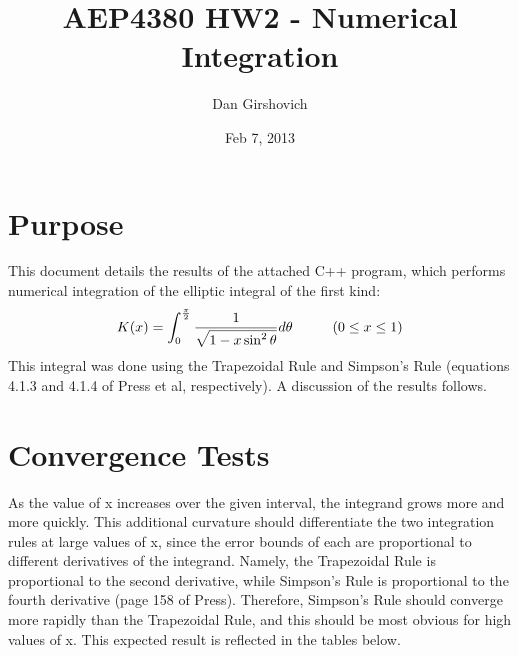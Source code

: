 \documentclass{article}
\title{AEP4380 HW2 - Numerical Integration}
\author{Dan Girshovich}
\date{Feb 7, 2013}
\begin{document}
\maketitle

\section{Purpose}
This document details the results of the attached C++ program, which performs numerical integration of the elliptic integral of the first kind:
\begin{align*}
K(x) = \int_{0}^{\frac{\pi}{2}} \frac{1}{\sqrt{1 - x \sin^2{\theta }}} d\theta \hspace{10mm} (0 \leq  x \leq 1)
\end{align*}
This integral was done using the Trapezoidal Rule and Simpson's Rule (equations 4.1.3 and 4.1.4 of Press\citep{numericalrecipies} et al, respectively). A discussion of the results follows.


\section{Convergence Tests}
As the value of x increases over the given interval, the integrand grows more and more quickly. This additional curvature should differentiate the two integration rules at large values of x, since the error bounds of each are proportional to different derivatives of the integrand. Namely, the Trapezoidal Rule is proportional to the second derivative, while Simpson's Rule is proportional to the fourth derivative (page 158 of Press\citep{numericalrecipies}). Therefore, Simpson's Rule should converge more rapidly than the Trapezoidal Rule, and this should be most obvious for high values of x. This expected result is reflected in the tables below.
\end{document}
